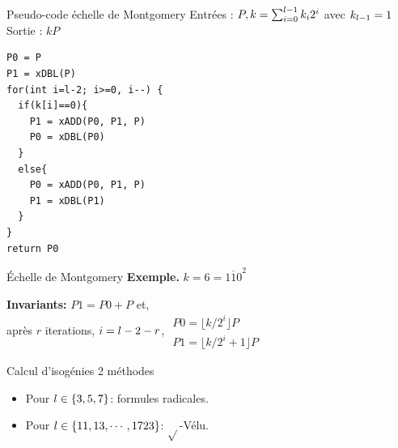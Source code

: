 \documentclass{beamer}
\begin{document}
\begin{frame}[fragile]{Pseudo-code \'echelle de Montgomery}
	\small	Entrées : $P, k = \sum_{i=0}^{\mathnormal{l}-1}k_i 2^i$ avec $k_{\mathnormal{l}-1}=1$\\
	Sortie : $kP$
\begin{verbatim}
P0 = P
P1 = xDBL(P)
for(int i=l-2; i>=0, i--) {
  if(k[i]==0){
    P1 = xADD(P0, P1, P)
    P0 = xDBL(P0)
  }
  else{
    P0 = xADD(P0, P1, P)
    P1 = xDBL(P1)
  }
}
return P0
\end{verbatim}
\end{frame}

	\begin{frame}{\'Echelle de Montgomery}
	\textbf{Exemple.} $k=6=\overline{110}^2$\\
	\begin{center}
	\end{center}
\textbf{Invariants:} $P1 = P0+P$ et,\\ après $r$ iterations, $i=\mathnormal{l}-2-r$,
$\begin{array}{l}P0 = \lfloor k/2^i\rfloor P \\ P1 = \lfloor k/2^i + 1\rfloor P\end{array}$
\end{frame}

\begin{frame}[fragile]{Calcul d'isog\'enies}
	2 m\'ethodes
	\begin{itemize}
		\item Pour $\mathnormal{l}\in\left\{3, 5, 7\right\}$: formules radicales.
		\item Pour $\mathnormal{l}\in\left\{11, 13, \cdots, 1723\right\}$: $\sqrt{}$-V\'elu.
	\end{itemize}
\end{frame}
\end{document}
